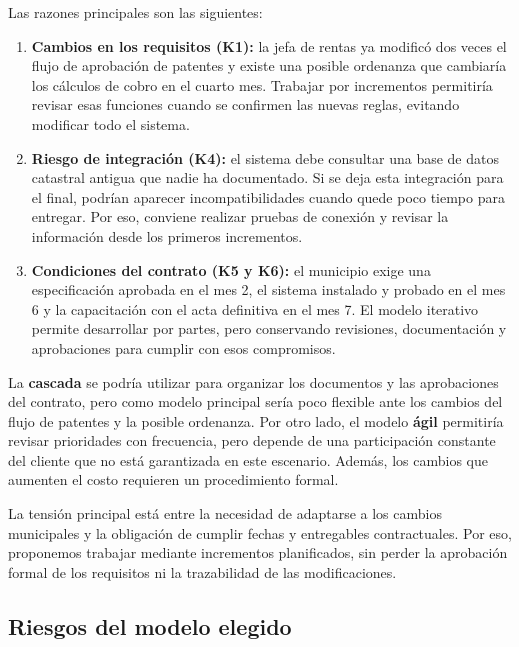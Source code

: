 \documentclass[10pt,letterpaper]{article}
\newcommand{\subtitulo}[1]{\subsection*{\textcolor{azul}{#1}}}
\begin{document}
\par
Las razones principales son las siguientes:
\par
\begin{enumerate}[leftmargin=*,itemsep=1pt]
\item \textbf{Cambios en los requisitos (K1):} la jefa de rentas ya modificó dos veces el flujo de aprobación de patentes y existe una posible ordenanza que cambiaría los cálculos de cobro en el cuarto mes. Trabajar por incrementos permitiría revisar esas funciones cuando se confirmen las nuevas reglas, evitando modificar todo el sistema.
\item \textbf{Riesgo de integración (K4):} el sistema debe consultar una base de datos catastral antigua que nadie ha documentado. Si se deja esta integración para el final, podrían aparecer incompatibilidades cuando quede poco tiempo para entregar. Por eso, conviene realizar pruebas de conexión y revisar la información desde los primeros incrementos.
\item \textbf{Condiciones del contrato (K5 y K6):} el municipio exige una especificación aprobada en el mes 2, el sistema instalado y probado en el mes 6 y la capacitación con el acta definitiva en el mes 7. El modelo iterativo permite desarrollar por partes, pero conservando revisiones, documentación y aprobaciones para cumplir con esos compromisos.
\end{enumerate}
\par
La \textbf{cascada} se podría utilizar para organizar los documentos y las aprobaciones del contrato, pero como modelo principal sería poco flexible ante los cambios del flujo de patentes y la posible ordenanza. Por otro lado, el modelo \textbf{ágil} permitiría revisar prioridades con frecuencia, pero depende de una participación constante del cliente que no está garantizada en este escenario. Además, los cambios que aumenten el costo requieren un procedimiento formal.
\par
La tensión principal está entre la necesidad de adaptarse a los cambios municipales y la obligación de cumplir fechas y entregables contractuales. Por eso, proponemos trabajar mediante incrementos planificados, sin perder la aprobación formal de los requisitos ni la trazabilidad de las modificaciones.
\par
\subtitulo{Riesgos del modelo elegido}
\par
\end{document}
